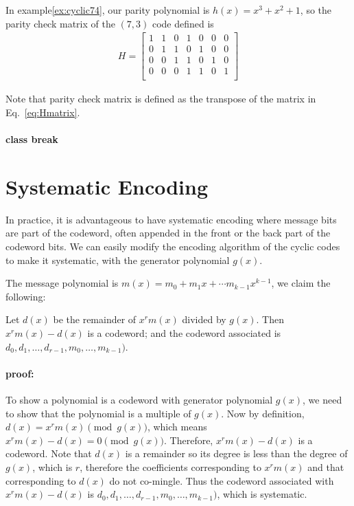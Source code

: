 \begin{example}
    In example\ref{ex:cyclic74}, our parity polynomial is \(h(x) = x^3 + x^2 + 1\), so the parity check matrix of the \((7,3)\) code defined is 
    \begin{align*}
   H=\left[
   \begin{array}{ccccccc}
      1 & 1 & 0 & 1 & 0 & 0 & 0 \\
      0 & 1 & 1 & 0 & 1 & 0 & 0 \\
      0 & 0 & 1 & 1 & 0 & 1 & 0 \\
      0 & 0 & 0 & 1 & 1 & 0 & 1 \\
      \end{array}
   \right]
\end{align*}
\end{example}
Note that parity check matrix is defined as the transpose of the matrix in Eq.~\ref{eq:Hmatrix}.

\paragraph{class break}

\section{Systematic Encoding}
In practice, it is advantageous to have systematic encoding where message bits are part of the codeword, often appended in the front or the back part of the codeword bits. We can easily modify the encoding algorithm of the cyclic codes to make it systematic, with the generator polynomial \(g(x)\).

The message polynomial is \(m(x) = m_0 + m_1 x + \cdots m_{k-1}x^{k-1}\), we claim the following: 
\begin{theorem}
Let \(d(x)\) be the remainder of \(x^{r} m(x)\) divided by \(g(x)\). Then \(x^{r} m(x) - d(x)\) is a codeword; and the codeword associated is \(d_0, d_1, \ldots, d_{r-1}, m_0, \ldots, m_{k-1})\).
\end{theorem}

\paragraph{proof:} To show a polynomial is a codeword with generator polynomial \(g(x)\), we need to show that the polynomial is a multiple of \(g(x)\). Now by definition, \(d(x) =x^{r} m(x) \pmod{g(x)}\), which means \(x^{r} m(x) - d(x) = 0 \pmod{g(x)}\). Therefore, \(x^{r} m(x) - d(x)\) is a codeword. Note that \(d(x)\) is a remainder so its degree is less than the degree of \(g(x)\), which is \(r\), therefore the coefficients corresponding to \(x^{r} m(x)\) and that corresponding to \(d(x)\) do not co-mingle. Thus the codeword associated with \(x^{r} m(x) - d(x)\) is \(d_0, d_1, \ldots, d_{r-1}, m_0, \ldots, m_{k-1})\), which is systematic.  

